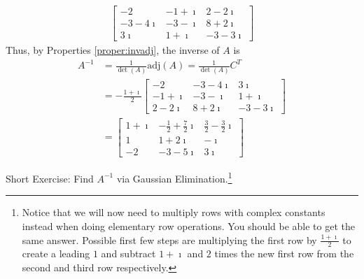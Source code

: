 \begin{solution}
\begin{align*}
\begin{bmatrix}
-2 & -1+\imath & 2-2\imath \\
-3-4\imath & -3-\imath & 8+2\imath \\
3\imath & 1+\imath & -3-3\imath
\end{bmatrix}
\end{align*}
Thus, by Properties \ref{proper:invadj}, the inverse of $A$ is
\begin{align*}
A^{-1} &= \frac{1}{\det(A)} \text{adj}(A) = \frac{1}{\det(A)} C^T \\
&= -\frac{1+\imath}{2} 
\begin{bmatrix}
-2 & -3-4\imath & 3\imath \\
-1+\imath & -3-\imath & 1+\imath \\
2-2\imath & 8+2\imath & -3-3\imath
\end{bmatrix} \\
&= 
\begin{bmatrix}
1+\imath & -\frac{1}{2}+\frac{7}{2}\imath & \frac{3}{2}-\frac{3}{2}\imath \\
1 & 1+2\imath & -\imath \\
-2 & -3-5\imath & 3\imath
\end{bmatrix} 
\end{align*}
\end{solution}

Short Exercise: Find $A^{-1}$ via Gaussian Elimination.\footnote{Notice that we will now need to multiply rows with complex constants instead when doing elementary row operations. You should be able to get the same answer. Possible first few steps are multiplying the first row by $\frac{1+\imath}{2}$ to create a leading $1$ and subtract $1+\imath$ and $2$ times the new first row from the second and third row respectively.}

